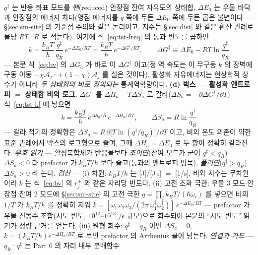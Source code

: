 \begin{bgbox}
$q^{\ddagger}$ 는 반응 좌표 모드를 \emph{뗀}(reduced) 안장점 잔여 자유도의 상태합, $\Delta E_0$ 는
우물 바닥과 안장점의 에너지 차다(영점 에너지를 $q$ 쪽에 두든 $\Delta E_0$ 쪽에 두든 곱은 불변이다
--- \S\ref{sec:sm-site} 의 기준점 주의와 같은 논리이고, 지수는 \S\ref{sec:dist} 와 같은 환산 관례로
몰당 $RT$·$R$ 로 적는다). 여기에 식~\eqref{eq:tst-freq} 의 통과 빈도를 곱하면
\begin{equation}
k=\frac{k_BT}{h}\,\frac{q^{\ddagger}}{q_R}\,e^{-\Delta E_0/RT}
=\frac{k_BT}{h}\,e^{-\Delta G^{\ddagger}/RT},
\qquad
\Delta G^{\ddagger}\equiv\Delta E_0-RT\ln\frac{q^{\ddagger}}{q_R}
\label{eq:tst-k}
\end{equation}
--- 본문 식~\eqref{eq:bv} 의 $\Delta G_a$ 가 바로 이 $\Delta G^{\ddagger}$ 이고(정$\cdot$역 속도는 이
무구동 $k$ 의 장벽에 구동 이동 $-\chi\mathcal A_j$·$+(1-\chi)\mathcal A_j$ 를 실은 것이다),
활성화 자유에너지는 현상학적 상수가 아니라 \emph{두 상태합의 비로 정의되는} 통계역학량이다.
\textbf{(d) 박스 --- 활성화 엔트로피 $=$ 상태합 비의 로그.} $\Delta G^{\ddagger}$ 를
$\Delta H_a-T\Delta S_a$ 로 갈라($\Delta S_a=-\partial\Delta G^{\ddagger}/\partial T$) 식~\eqref{eq:tst-k}
에 넣으면
\begin{equation}
\boxed{\;k=\frac{k_BT}{h}\,e^{\Delta S_a/R}\,e^{-\Delta H_a/RT},\qquad
\Delta S_a=R\ln\frac{q^{\ddagger}}{q_R}\;}
\label{eq:tst-eyring}
\end{equation}
--- 갈라 적기의 정확형은 $\Delta S_a=R\,\partial\big[T\ln(q^{\ddagger}/q_R)\big]/\partial T$ 이고, 비의
온도 의존이 약한 표준 관례에서 박스의 로그형으로 줄며, 그때 $\Delta H_a=\Delta E_0$ 로 두 항이
정확히 갈라진다. \emph{부호 읽기} --- 활성복합체가 반응물보다 \emph{조이면}(잔여 모드가 굳어
$q^{\ddagger}<q_R$) $\Delta S_a<0$ 라 prefactor 가 $k_BT/h$ 보다 줄고(통과의 엔트로피 병목),
\emph{풀리면}($q^{\ddagger}>q_R$) $\Delta S_a>0$ 라 는다.
\emph{검산} --- (i) 차원: $k_BT/h$ 는 [J]/[J\,s] $=$ [1/s], 비와 지수는 무차원이라 $k$ 는
식~\eqref{eq:bv} 의 $r_j^\pm$ 와 같은 자리당 빈도다. (ii) 고전 조화 극한: 우물 3 모드$\cdot$안장점
잔여 2 모드에 \S\ref{sec:sm-site} 의 고전 극한 $q=\prod_i k_BT/(\hbar\omega_i)$ 를 넣으면 비의 $1/T$
가 $k_BT/h$ 를 정확히 지워 $k=[\omega_1\omega_2\omega_3/(2\pi\,\omega_1^{\ddagger}\omega_2^{\ddagger})]
\,e^{-\Delta E_0/RT}$ --- prefactor 가 우물 진동수 조합(시도 빈도, $10^{12}$--$10^{13}$ /s 규모)으로
회수되어 본문의 ``시도 빈도'' 읽기가 정량 근거를 얻는다\cite{mcquarrie1976}. (iii) 원형 회수:
$q^{\ddagger}=q_R$ 이면 $\Delta S_a=0$, $k=(k_BT/h)e^{-\Delta H_a/RT}$ 로 보편 prefactor 의 Arrhenius
꼴이 남는다.
\emph{연결과 가드} --- $q_R$·$q^{\ddagger}$ 는 Part 0 의 자리 내부 분배함수

\end{bgbox}
